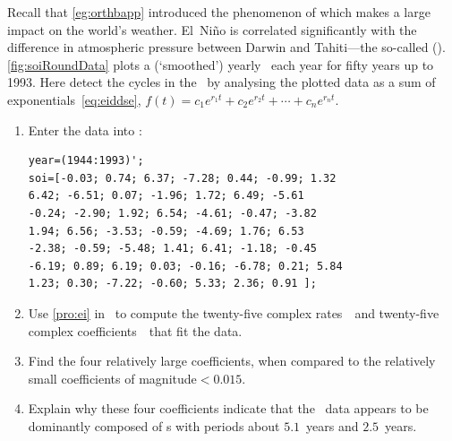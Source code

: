 \begin{exercise}  
Recall that \cref{eg:orthbapp} introduced the phenomenon of  which makes a large impact on the world's weather.
El~Ni\~no is correlated significantly with the difference in atmospheric pressure between Darwin and Tahiti---the so-called  (\soi).
\cref{fig:soiRoundData} plots a (`smoothed') yearly  \soi\ each year for fifty years up to 1993.
Here detect the cycles in the \soi\ by analysing the plotted data as a sum of exponentials~\eqref{eq:eiddse}, \(f(t)=c_1e^{r_1t}+c_2e^{r_2t}+\cdots+c_ne^{r_nt}\).
\begin{enumerate}
\item Enter the data into \script:
\setbox\ajrqrbox\hbox{}\marginajrbox%
\begin{verbatim}
year=(1944:1993)';
soi=[-0.03; 0.74; 6.37; -7.28; 0.44; -0.99; 1.32
6.42; -6.51; 0.07; -1.96; 1.72; 6.49; -5.61
-0.24; -2.90; 1.92; 6.54; -4.61; -0.47; -3.82
1.94; 6.56; -3.53; -0.59; -4.69; 1.76; 6.53
-2.38; -0.59; -5.48; 1.41; 6.41; -1.18; -0.45
-6.19; 0.89; 6.19; 0.03; -0.16; -6.78; 0.21; 5.84
1.23; 0.30; -7.22; -0.60; 5.33; 2.36; 0.91 ];
\end{verbatim}

\item Use \cref{pro:ei} in \script\ to compute the twenty-five complex rates~\rv\ and twenty-five complex coefficients~\cv\ that fit the data.

\item Find the four relatively large coefficients, when compared to the relatively small coefficients of magnitude\({}<0.015\).

\item Explain why these four coefficients indicate that the \soi\ data appears to be dominantly composed of s with periods about \(5.1\)~years and \(2.5\)~years.

\end{enumerate}
\end{exercise}

